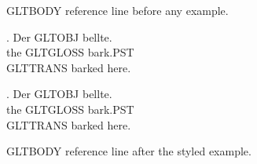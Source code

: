 

GLTBODY reference line before any example.

\exg. Der GLTOBJ bellte.\\ the GLTGLOSS bark.PST\\
\glt GLTTRANS barked here.

\renewcommand\GlossTransStyle{\Large}

\exg. Der GLTOBJ bellte.\\ the GLTGLOSS bark.PST\\
\glt GLTTRANS barked here.

GLTBODY reference line after the styled example.

